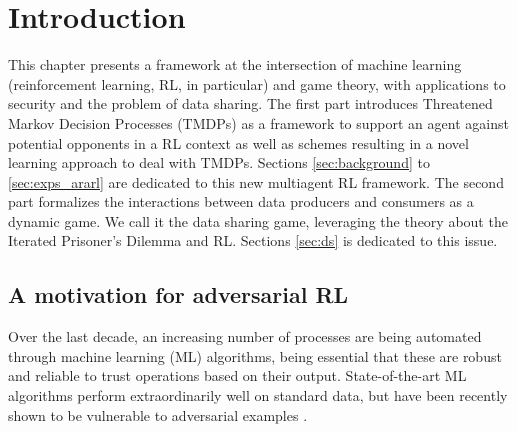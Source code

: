 \section{Introduction}

This chapter presents a framework at the intersection of machine learning (reinforcement learning, RL, in particular) and game theory, with applications to security and the problem of data sharing. 
The first part introduces Threatened Markov Decision Processes (TMDPs) 
as  a framework to support an agent against potential opponents
in a RL context as well as schemes 
resulting in a novel learning approach to deal with TMDPs. Sections \ref{sec:background} to \ref{sec:exps_ararl} are dedicated to this new multiagent RL framework.
The second part formalizes the interactions between data producers and consumers as a dynamic game. We call it the data sharing game, leveraging the theory about the Iterated Prisoner's Dilemma and RL. Sections \ref{sec:ds} is dedicated to this issue.



\subsection{A motivation for adversarial RL}
Over the last decade,
an increasing number of processes are being automated through 
machine learning (ML) algorithms, being essential that these are robust and 
reliable to trust operations based on their output. State-of-the-art
ML algorithms perform extraordinarily well on standard data, but  
have been recently shown to be vulnerable to adversarial examples %
\parencite{goodfellow2014explaining}. 

